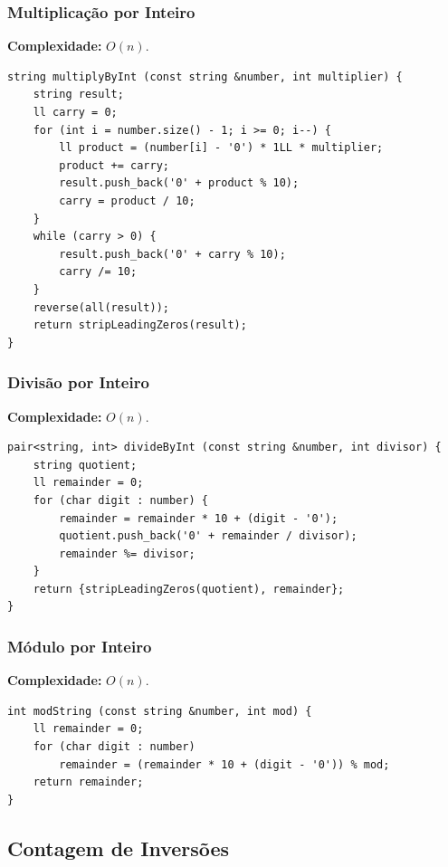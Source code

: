 \subsubsection*{Multiplicação por Inteiro}

\textbf{Complexidade:} $O(n)$.

\begin{lstlisting}
string multiplyByInt (const string &number, int multiplier) {
    string result;
    ll carry = 0;
    for (int i = number.size() - 1; i >= 0; i--) {
        ll product = (number[i] - '0') * 1LL * multiplier;
        product += carry;
        result.push_back('0' + product % 10);
        carry = product / 10;
    }
    while (carry > 0) {
        result.push_back('0' + carry % 10);
        carry /= 10;
    }
    reverse(all(result));
    return stripLeadingZeros(result);
}
\end{lstlisting}

\subsubsection*{Divisão por Inteiro}

\textbf{Complexidade:} $O(n)$.

\begin{lstlisting}
pair<string, int> divideByInt (const string &number, int divisor) {
    string quotient;
    ll remainder = 0;
    for (char digit : number) {
        remainder = remainder * 10 + (digit - '0');
        quotient.push_back('0' + remainder / divisor);
        remainder %= divisor;
    }
    return {stripLeadingZeros(quotient), remainder};
}
\end{lstlisting}

\subsubsection*{Módulo por Inteiro}

\textbf{Complexidade:} $O(n)$.

\begin{lstlisting}
int modString (const string &number, int mod) {
    ll remainder = 0;
    for (char digit : number) 
        remainder = (remainder * 10 + (digit - '0')) % mod;
    return remainder;
}
\end{lstlisting}


\subsection{Contagem de Inversões}

